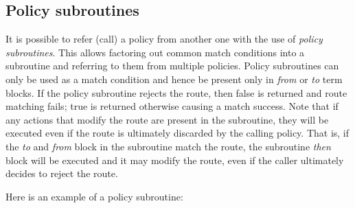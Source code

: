 \subsection{Policy subroutines}
It is possible to refer (call) a policy from another one with the use of {\em
policy subroutines}.  This allows factoring out common match conditions into a
subroutine and referring to them from multiple policies.  Policy subroutines can
only be used as a match condition and hence be present only in {\em from} or
{\em to} term blocks.  If the policy subroutine rejects the route, then false is
returned and route matching fails; true is returned otherwise causing a match
success.  Note that if any actions that modify the route are present in the
subroutine, they will be executed even if the route is ultimately discarded by
the calling policy.  That is, if the {\em to} and {\em from} block in the
subroutine match the route, the subroutine {\em then} block will be executed and
it may modify the route, even if the caller ultimately decides to reject the
route.

Here is an example of a policy subroutine:

\noindent{}

